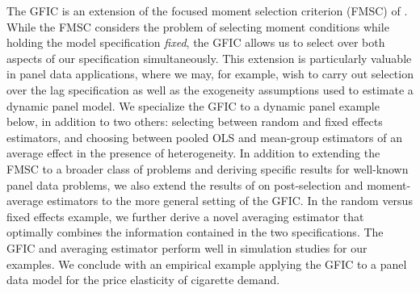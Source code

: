 The GFIC is an extension of the focused moment selection criterion (FMSC) of \cite{DiTraglia2016}.
While the FMSC considers the problem of selecting moment conditions while holding the model specification \emph{fixed}, the GFIC allows us to select over both aspects of our specification simultaneously.
This extension is particularly valuable in panel data applications, where we may, for example, wish to carry out selection over the lag specification as well as the exogeneity assumptions used to estimate a dynamic panel model.
We specialize the GFIC to a dynamic panel example below, in addition to two others: selecting between random and fixed effects estimators, and choosing between pooled OLS and mean-group estimators of an average effect in the presence of heterogeneity.  
In addition to extending the FMSC to a broader class of problems and deriving specific results for well-known panel data problems, we also extend the results of \cite{DiTraglia2016} on post-selection and moment-average estimators to the more general setting of the GFIC.  
In the random versus fixed effects example, we further derive a novel averaging estimator that optimally combines the information contained in the two specifications.
The GFIC and averaging estimator perform well in simulation studies for our examples.
We conclude with an empirical example applying the GFIC to a panel data model for the price elasticity of cigarette demand. 

